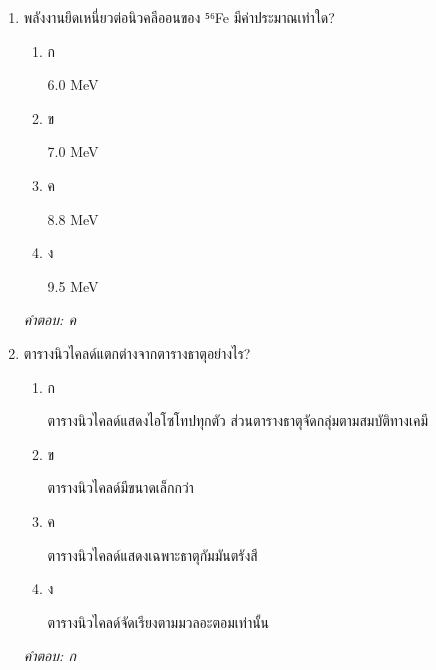 \documentclass[12pt]{article}
\begin{document}
\begin{enumerate}[label=\arabic*., itemsep=0.5\baselineskip, topsep=0.5\baselineskip, leftmargin=*]
\item พลังงานยึดเหนี่ยวต่อนิวคลีออนของ ⁵⁶Fe มีค่าประมาณเท่าใด?
\begin{enumerate}[label=\alph*)., itemsep=0.3\baselineskip, topsep=0.3\baselineskip]
\item ก\ 
\begin{minipage}[t]{0.9\linewidth}
\raggedright 6.0 MeV
\end{minipage}
\item ข\ 
\begin{minipage}[t]{0.9\linewidth}
\raggedright 7.0 MeV
\end{minipage}
\item ค\ 
\begin{minipage}[t]{0.9\linewidth}
\raggedright 8.8 MeV
\end{minipage}
\item ง\ 
\begin{minipage}[t]{0.9\linewidth}
\raggedright 9.5 MeV
\end{minipage}
\end{enumerate}
\vspace{-0.3\baselineskip}
\begin{small}
\textit{คำตอบ: ค}
\end{small}

\item ตารางนิวไคลด์แตกต่างจากตารางธาตุอย่างไร?
\begin{enumerate}[label=\alph*)., itemsep=0.3\baselineskip, topsep=0.3\baselineskip]
\item ก\ 
\begin{minipage}[t]{0.9\linewidth}
\raggedright ตารางนิวไคลด์แสดงไอโซโทปทุกตัว ส่วนตารางธาตุจัดกลุ่มตามสมบัติทางเคมี
\end{minipage}
\item ข\ 
\begin{minipage}[t]{0.9\linewidth}
\raggedright ตารางนิวไคลด์มีขนาดเล็กกว่า
\end{minipage}
\item ค\ 
\begin{minipage}[t]{0.9\linewidth}
\raggedright ตารางนิวไคลด์แสดงเฉพาะธาตุกัมมันตรังสี
\end{minipage}
\item ง\ 
\begin{minipage}[t]{0.9\linewidth}
\raggedright ตารางนิวไคลด์จัดเรียงตามมวลอะตอมเท่านั้น
\end{minipage}
\end{enumerate}
\vspace{-0.3\baselineskip}
\begin{small}
\textit{คำตอบ: ก}
\end{small}


\end{enumerate}
\end{document}

